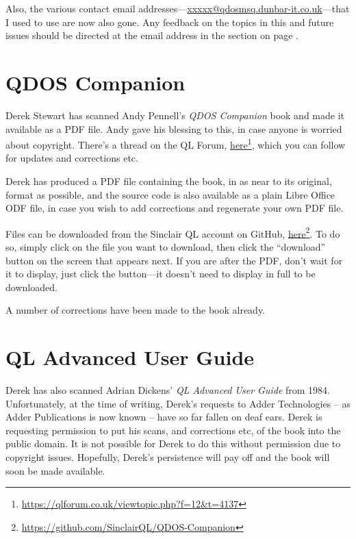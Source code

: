 Also, the various contact email addresses---\url{xxxxx@qdosmsq.dunbar-it.co.uk}---that I used to use are now also gone. Any feedback on the topics in this and future issues should be directed at the email address in the  section on page \pageref{section: feedback}.

\section{QDOS Companion}

Derek Stewart has scanned Andy Pennell's \emph{QDOS Companion} book
and made it available as a PDF file. Andy gave his blessing to this,
in case anyone is worried about copyright. There's a thread on the
QL Forum, \href{https://qlforum.co.uk/viewtopic.php?f=12&t=4137}{here}\footnote{\url{https://qlforum.co.uk/viewtopic.php?f=12\&t=4137}},
which you can follow for updates and corrections etc.

Derek has produced a PDF file containing the book, in as near to its
original, format as possible, and the source code is also available
as a plain Libre Office ODF file, in case you wish to add corrections
and regenerate your own PDF file.

Files can be downloaded from the Sinclair QL account on GitHub, \href{https://github.com/SinclairQL/QDOS-Companion}{here}\footnote{\url{https://github.com/SinclairQL/QDOS-Companion}}.
To do so, simply click on the file you want to download, then click
the ``download'' button on the screen that appears next. If you
are after the PDF, don't wait for it to display, just click the button---it 
doesn't need to display in full to be downloaded.

A number of corrections have been made to the book already.

\section{QL Advanced User Guide}

Derek has also scanned Adrian Dickens' \emph{QL Advanced User Guide}
from 1984. Unfortunately, at the time of writing, Derek's requests
to Adder Technologies -- as Adder Publications is now known -- have
so far fallen on deaf ears. Derek is requesting permission to put
his scans, and corrections etc, of the book into the public domain.
It is not possible for Derek to do this without permission due to
copyright issues. Hopefully, Derek's persistence will pay off and
the book will soon be made available.
